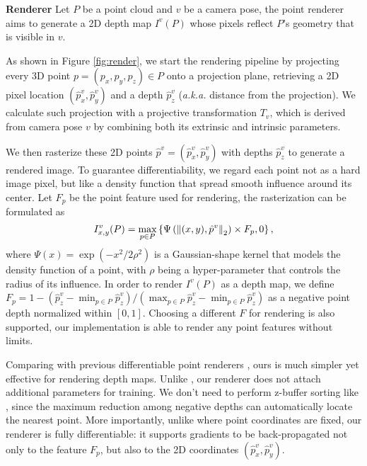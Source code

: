 \documentclass[final]{cvpr}
\begin{document}
\noindent\textbf{Renderer}
Let $P$ be a point cloud and $v$ be a camera pose,
the point renderer aims to generate a 2D depth map $I^v(P)$ whose pixels reflect $P$'s geometry that is visible in $v$.

As shown in Figure \ref{fig:render}, we start the rendering pipeline by projecting every 3D point $p=(p_x,p_y,p_z) \in P$ onto a projection plane, retrieving a 2D pixel location $(\hat{p}_x^v, \hat{p}_y^v)$ and a depth $\hat{p}_z^v$ (\emph{a.k.a.} distance from the projection). We calculate such projection with a projective transformation $T_v$, which is derived from camera pose $v$ by combining both its extrinsic and intrinsic parameters. 

We then rasterize these 2D points $\hat{p}^v=(\hat{p}_x^v, \hat{p}_y^v)$ with depths $\hat{p}_z^v$ to generate a rendered image.
To guarantee differentiability, we regard each point not as a hard image pixel, but like a density function that spread smooth influence around its center. Let $F_{p}$ be the point feature used for rendering, the rasterization can be formulated as
\vspace{-0.5em}
\begin{equation}
\vspace{-0.5em}
I^v_{x, y}(P) = \max_{p \in P}\left\{\Psi \left( \left\|(x, y), \hat{p}^v \right\|_2  \right) \times F_{p}, 0 \right\},
\end{equation}
where $\Psi(x)=\exp(-{x^2}/{2\rho^2})$ is a Gaussian-shape kernel that models the density function of a point, with $\rho$ being a hyper-parameter that controls the radius of its influence.
In order to render $I^v(P)$ as a depth map, we define $F_{p}=1 - (\hat{p}_z^v - \min_{p\in P} \hat{p}_z^v) / (\max_{p\in P} \hat{p}_z^v - \min_{p\in P} \hat{p}_z^v)$ as a negative point depth normalized within $[0, 1]$. Choosing a different $F$ for rendering is also supported, our implementation is able to render any point features without limits.

Comparing with previous differentiable point renderers \cite{insafutdinov2018unsupervised,yifan2019differentiable,aliev2019neural,wiles2020synsin,dai2020neural}, ours is much simpler yet effective for rendering depth maps. Unlike \cite{dai2020neural}, our renderer does not attach additional parameters for training. We don't need to perform z-buffer sorting like \cite{wiles2020synsin,insafutdinov2018unsupervised}, since the maximum reduction among negative depths can automatically locate the nearest point. 
More importantly, unlike \cite{aliev2019neural} where point coordinates are fixed, our renderer is fully differentiable: it supports gradients to be back-propagated not only to the feature $F_p$, but also to the 2D coordinates $(\hat{p}_x^v, \hat{p}_y^v)$.
\end{document}
